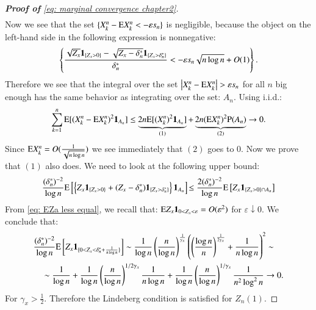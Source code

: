 \begin{proof}[\hypertarget{proof of lemma 2}{\textbf{Proof of}} \eqref{eq: marginal convergence chapter2}]
\begin{align*}
\end{align*}
Now we see that the set $\{X^n_k-\mathrm{E} X^n_k < - \varepsilon s_n\}$ is negligible, because the object on the left-hand side in the following expression is nonnegative:
\begin{align*}
   \left\{ \frac{\sqrt{Z_x} \mathbf{1}_{\{Z_x > 0 \}} - \sqrt{Z_x - \delta^*_n} \mathbf{1}_{\{Z_x > \delta^*_n \}}}{ \delta^*_n} < - \varepsilon s_n \sqrt{n \log{n}}  + O(1) \right\}.
\end{align*}
Therefore we see that the integral over the set $\left|X^n_k-\ex X^n_k\right|>\varepsilon s_n$ for all $n$ big enough has the same behavior as integrating over the set: $A_n$. Using i.i.d.:
\begin{align*}
\sum_{k=1}^{n} \mathrm{E} [(X^n_k - \mathrm{E} X^n_k)^2 \mathbf{1}_{A_n}] \leq \underbrace{2 n \mathrm{E} [(X^n_k)^2 \mathbf{1}_{A_n}]}_{(1)} + \underbrace{2 n (\mathrm{E}  X^n_k)^2 \mathrm{P}(A_n)}_{(2)} \rightarrow 0.   
\end{align*}
Since $\mathrm{E}  X_k^n = O(\frac{1}{\sqrt{n \log{n}}})$ we see immediately that $(2)$ goes to 0. Now we prove that $(1)$ also does. We need to look at the following upper bound:
\begin{align*}
\frac{(\delta^*_n)^{-2}}{\log{n}} \ex  \left[ \left\{ Z_x \ind_{\{Z_x > 0 \}} + (Z_x - \delta^*_n) \ind_{\{Z_x > \delta^*_n \}} \right\} \ind_{A_n} \right] \hspace{-0.05cm} \leq \frac{2(\delta^*_n)^{-2}}{\log{n}} \ex  \left[  Z_x \ind_{\{Z_x > 0 \} \cap A_n} \right]
\end{align*}
From \eqref{eq: EZa less equal}, we recall that: $\mathrm{E} Z_x \mathbf{1}_{0 < Z_x < \varepsilon} = O(\varepsilon^2)$ for $\varepsilon \downarrow 0$. We conclude that:
\begin{align*}
    &\frac{(\delta^*_n)^{-2}}{\log{n}} \mathrm{E}  \left[  Z_x \mathbf{1}_{\{0 < Z_x < \delta^*_n + \frac{1}{n \log{n}} \}} \right] \sim \frac{1}{\log{n}} \left( \frac{n}{\log{n}} \right)^{\frac{1}{\gamma_x}} \left( \left(\frac{\log{n}}{n} \right)^{\frac{1}{2\gamma_x}} + \frac{1}{n \log{n}} \right)^2 \sim \\
    & \quad \sim \frac{1}{\log{n}} + \frac{1}{\log{n}} \left(\frac{n}{\log{n}} \right)^{1/2\gamma_x} \frac{1}{n \log{n}} + \frac{1}{\log{n}}
 \left( \frac{n}{\log{n}} \right)^{1/\gamma_x} \frac{1}{n^2 \log^2{n}} \rightarrow 0.
 \end{align*}
 For $\gamma_x> \frac{1}{2}$. Therefore the Lindeberg condition is satisfied for $Z_n(1)$.
\end{proof}

